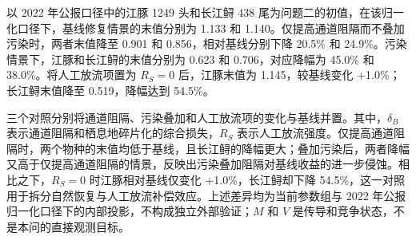 以 2022 年公报口径中的江豚 1249 头和长江鲟 438 尾为问题二的初值，在该归一化口径下，基线修复情景的末值分别为 1.133 和 1.140。仅提高通道阻隔而不叠加污染时，两者末值降至 0.901 和 0.856，相对基线分别下降 20.5\% 和 24.9\%。污染情景下，江豚和长江鲟的末值分别为 0.623 和 0.706，对应降幅为 45.0\% 和 38.0\%。将人工放流项置为 \(R_S=0\) 后，江豚末值为 1.145，较基线变化 +1.0\%；长江鲟末值降至 0.519，降幅达到 54.5\%。

三个对照分别将通道阻隔、污染叠加和人工放流项的变化与基线并置。其中，\(\delta_B\) 表示通道阻隔和栖息地碎片化的综合损失，\(R_S\) 表示人工放流强度。仅提高通道阻隔时，两个物种的末值均低于基线，且长江鲟的降幅更大；叠加污染后，两者降幅又高于仅提高通道阻隔的情景，反映出污染叠加阻隔对基线收益的进一步侵蚀。相比之下，\(R_S=0\) 时江豚相对基线仅变化 +1.0\%，长江鲟却下降 54.5\%，这一对照用于拆分自然恢复与人工放流补偿效应。上述差异均为当前参数组与 2022 年公报归一化口径下的内部投影，不构成独立外部验证；\(M\) 和 \(V\) 是传导和竞争状态，不是本问的直接观测目标。
